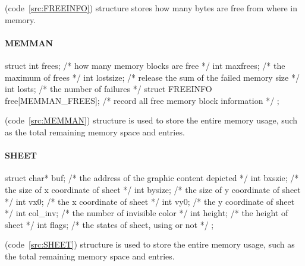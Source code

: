 \documentclass{swfcthesis}
\begin{document}
(code~\ref{src:FREEINFO}) structure stores how many bytes are
free from where in memory.




\paragraph{MEMMAN}

\begin{listing}[H]
  \begin{codeblock}
\begin{ccode}
struct 
{ 
  int frees;                           /* how many memory blocks are free */
  int maxfrees;                        /* the maximum of frees */
  int lostsize;                        /* release the sum of the failed memory size */
  int losts;                           /* the number of failures */
  struct FREEINFO free[MEMMAN_FREES];  /* record all free memory block information */
};
\end{ccode}
  \end{codeblock}
  \caption{\emph{struct MEMMAN}}\label{src:MEMMAN}
\end{listing}

(code~\ref{src:MEMMAN}) structure is used to store the entire memory usage, such as the total
remaining memory space and entries.



\paragraph{SHEET}

\begin{listing}[H]
  \begin{codeblock}
\begin{ccode}
struct 
{ 
  char* buf;   /* the address of the graphic content depicted */
  int bxszie;  /* the size of x coordinate of sheet */
  int bysize;  /* the size of y coordinate of sheet */
  int vx0;     /* the x coordinate of sheet */
  int vy0;     /* the y coordinate of sheet */
  int col_inv; /* the number of invisible color */
  int height;  /* the height of sheet */
  int flags;   /* the states of sheet, using or not */
};
\end{ccode}
  \end{codeblock}
  \caption{\emph{struct SHEET}}\label{src:SHEET}
\end{listing}

(code~\ref{src:SHEET}) structure is used to store the entire memory usage, such as the
total remaining memory space and entries.
\end{document}
